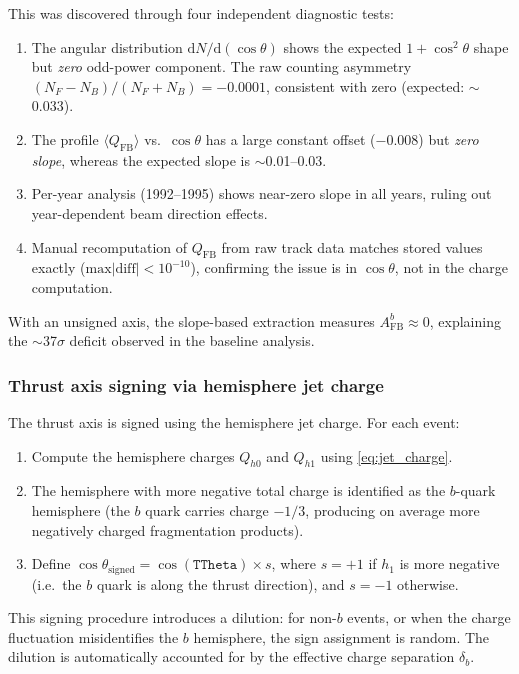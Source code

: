 \documentclass[11pt,a4paper]{article}
\begin{document}
This was discovered through four independent diagnostic tests:
\begin{enumerate}
\item The angular distribution $\mathrm{d}N/\mathrm{d}(\cos\theta)$
  shows the expected $1 + \cos^2\theta$ shape but \emph{zero}
  odd-power component.
  The raw counting asymmetry
  $(N_F - N_B)/(N_F + N_B) = -0.0001$, consistent with zero
  (expected: $\sim$0.033).
\item The profile $\langle Q_\text{FB}\rangle$ vs.\
  $\cos\theta$ has a large constant offset ($-0.008$) but
  \emph{zero slope}, whereas the expected slope is
  $\sim$0.01--0.03.
\item Per-year analysis (1992--1995) shows near-zero slope in
  all years, ruling out year-dependent beam direction effects.
\item Manual recomputation of $Q_\text{FB}$ from raw track data
  matches stored values exactly ($\text{max}|{\text{diff}}| <
  10^{-10}$), confirming the issue is in $\cos\theta$, not in
  the charge computation.
\end{enumerate}

With an unsigned axis, the slope-based extraction measures
$A_\text{FB}^b \approx 0$, explaining the $\sim$37$\sigma$
deficit observed in the baseline analysis.

\subsubsection{Thrust axis signing via hemisphere jet charge}
\label{sec:corrections:signing}

The thrust axis is signed using the hemisphere jet charge.
For each event:
\begin{enumerate}
\item Compute the hemisphere charges $Q_{h0}$ and $Q_{h1}$
  using \cref{eq:jet_charge}.
\item The hemisphere with more negative total charge is identified
  as the $b$-quark hemisphere (the $b$ quark carries charge
  $-1/3$, producing on average more negatively charged
  fragmentation products).
\item Define
  $\cos\theta_\text{signed} = \cos(\texttt{TTheta}) \times s$,
  where $s = +1$ if $h_1$ is more negative (i.e.\ the $b$ quark
  is along the thrust direction), and $s = -1$ otherwise.
\end{enumerate}

This signing procedure introduces a dilution: for non-$b$ events,
or when the charge fluctuation misidentifies the $b$ hemisphere,
the sign assignment is random.
The dilution is automatically accounted for by the effective charge
separation $\delta_b$.
\end{document}
